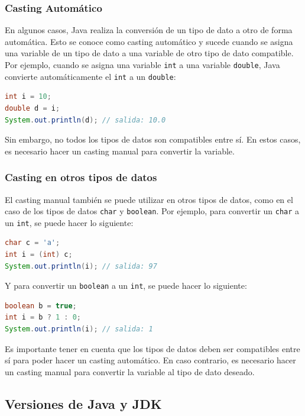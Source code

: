 \documentclass[executivepaper]{article}
\begin{document}
\subsubsection{Casting Automático}

En algunos casos, Java realiza la conversión de un tipo de dato a otro de forma automática. Esto se conoce como casting automático y sucede cuando se asigna una variable de un tipo de dato a una variable de otro tipo de dato compatible. Por ejemplo, cuando se asigna una variable \texttt{int} a una variable \texttt{double}, Java convierte automáticamente el \texttt{int} a un \texttt{double}:

\begin{lstlisting}[language=Java]
int i = 10;
double d = i;
System.out.println(d); // salida: 10.0
\end{lstlisting}

Sin embargo, no todos los tipos de datos son compatibles entre sí. En estos casos, es necesario hacer un casting manual para convertir la variable.

\subsubsection{Casting en otros tipos de datos}

El casting manual también se puede utilizar en otros tipos de datos, como en el caso de los tipos de datos \texttt{char} y \texttt{boolean}. Por ejemplo, para convertir un \texttt{char} a un \texttt{int}, se puede hacer lo siguiente:

\begin{lstlisting}[language=Java]
char c = 'a';
int i = (int) c;
System.out.println(i); // salida: 97
\end{lstlisting}

Y para convertir un \texttt{boolean} a un \texttt{int}, se puede hacer lo siguiente:

\begin{lstlisting}[language=Java]
boolean b = true;
int i = b ? 1 : 0;
System.out.println(i); // salida: 1
\end{lstlisting}

Es importante tener en cuenta que los tipos de datos deben ser compatibles entre sí para poder hacer un casting automático. En caso contrario, es necesario hacer un casting manual para convertir la variable al tipo de dato deseado.

\subsection*{Versiones de Java y JDK}
\end{document}
